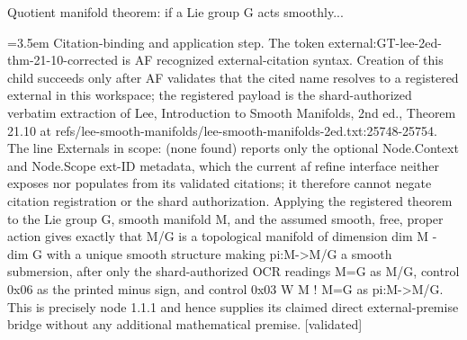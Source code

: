 \documentclass{article}
\newcommand{\step}[1]{\par\noindent\hangindent=3.5em\hangafter=1%
  \makebox[3.5em][l]{\textbf{#1.}}}
\newcommand{\steptag}[1]{\hfill{\small\textsf{[#1]}}}
\begin{document}
\begin{proofbox}{Quotient manifold theorem: if a Lie group G acts smoothly...}
\step{1.1.1.1} Citation-binding and application step. The token external:GT-lee-2ed-thm-21-10-corrected is AF recognized external-citation syntax. Creation of this child succeeds only after AF validates that the cited name resolves to a registered external in this workspace; the registered payload is the shard-authorized verbatim extraction of Lee, Introduction to Smooth Manifolds, 2nd ed., Theorem 21.10 at refs/lee-smooth-manifolds/lee-smooth-manifolds-2ed.txt:25748-25754. The line Externals in scope: (none found) reports only the optional Node.Context and Node.Scope ext-ID metadata, which the current af refine interface neither exposes nor populates from its validated citations; it therefore cannot negate citation registration or the shard authorization. Applying the registered theorem to the Lie group G, smooth manifold M, and the assumed smooth, free, proper action gives exactly that M/G is a topological manifold of dimension dim M - dim G with a unique smooth structure making pi:M->M/G a smooth submersion, after only the shard-authorized OCR readings M=G as M/G, control 0x06 as the printed minus sign, and control 0x03 W M ! M=G as pi:M->M/G. This is precisely node 1.1.1 and hence supplies its claimed direct external-premise bridge without any additional mathematical premise. \steptag{validated} \\[4pt]
\end{proofbox}
\end{document}

